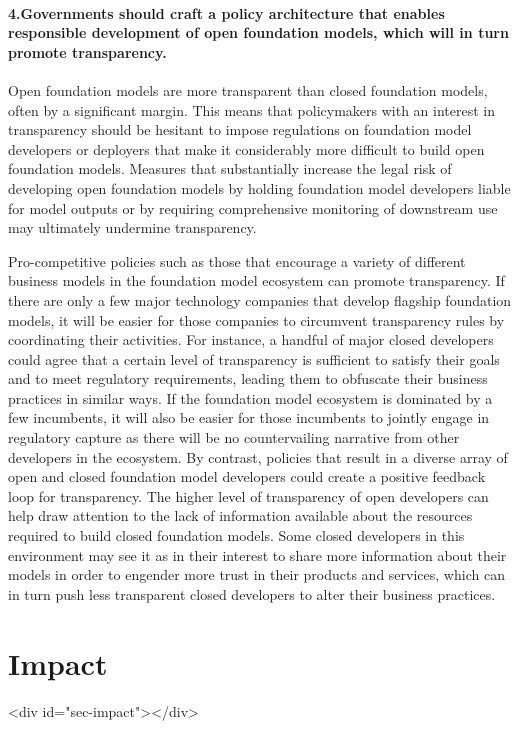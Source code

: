 \documentclass[screen, authorversion, acmsmall]{acmart}
\begin{document}
\paragraph{4.\phantom{X}Governments should craft a policy architecture that enables responsible development of open foundation models, which will in turn promote transparency.}
\begin{myitemize}
\item Open foundation models are more transparent than closed foundation models, often by a significant margin. 
This means that policymakers with an interest in transparency should be hesitant to impose regulations on foundation model developers or deployers that make it considerably more difficult to build open foundation models. 
Measures that substantially increase the legal risk of developing open foundation models by holding foundation model developers liable for model outputs or by requiring comprehensive monitoring of downstream use may ultimately undermine transparency.
\item Pro-competitive policies such as those that encourage a variety of different business models in the foundation model ecosystem can promote transparency. 
If there are only a few major technology companies that develop flagship foundation models, it will be easier for those companies to circumvent transparency rules by coordinating their activities. 
For instance, a handful of major closed developers could agree that a certain level of transparency is sufficient to satisfy their goals and to meet regulatory requirements, leading them to obfuscate their business practices in similar ways.
If the foundation model ecosystem is dominated by a few incumbents, it will also be easier for those incumbents to jointly engage in regulatory capture as there will be no countervailing narrative from other developers in the ecosystem.
By contrast, policies that result in a diverse array of open and closed foundation model developers could create a positive feedback loop for transparency.
The higher level of transparency of open developers can help draw attention to the lack of information available about the resources required to build closed foundation models.
Some closed developers in this environment may see it as in their interest to share more information about their models in order to engender more trust in their products and services, which can in turn push less transparent closed developers to alter their business practices.
\end{myitemize}
\clearpage
\hypertarget{impact}{\section{Impact}}
<div id="sec-impact"></div>
\end{document}
